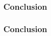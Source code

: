   \begin{frame}
      \frametitle{Conclusion}
      \centering
      
  \end{frame}

  \begin{frame}
      \frametitle{Conclusion}
      \begin{columns}
          \begin{column}{0.35\textwidth}
              \centering
          \end{column}
          \begin{column}{0.6\textwidth}
              \centering
          \end{column}
      \end{columns}
  \end{frame}
